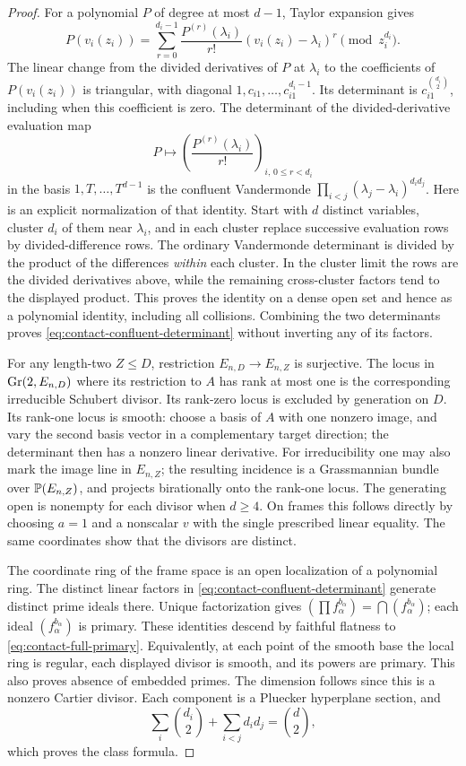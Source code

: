 \begin{proof}
For a polynomial $P$ of degree at most $d-1$, Taylor expansion gives
\[
 P(v_i(z_i))=\sum_{r=0}^{d_i-1}
             \frac{P^{(r)}(\lambda_i)}{r!}
                    (v_i(z_i)-\lambda_i)^r\pmod {z_i^{d_i}}.
\]
The linear change from the divided derivatives of $P$ at $\lambda_i$
to the coefficients of $P(v_i(z_i))$ is triangular, with diagonal
$1,c_{i1},\ldots,c_{i1}^{d_i-1}$. Its determinant is
$c_{i1}^{\binom{d_i}{2}}$, including when this coefficient is zero.
The determinant of the divided-derivative evaluation map
\[
 P\longmapsto\left(\frac{P^{(r)}(\lambda_i)}{r!}\right)_{i,\,0\le r<d_i}
\]
in the basis $1,T,\ldots,T^{d-1}$ is the confluent Vandermonde
$\prod_{i<j}(\lambda_j-\lambda_i)^{d_i d_j}$. Here is an explicit
normalization of that identity. Start with $d$ distinct variables,
cluster $d_i$ of them near $\lambda_i$, and in each cluster replace
successive evaluation rows by divided-difference rows. The ordinary
Vandermonde determinant is divided by the product of the differences
\emph{within} each cluster. In the cluster limit the rows are the
divided derivatives above, while the remaining cross-cluster
factors tend to the displayed product. This proves the identity on
a dense open set and hence as a polynomial identity, including all
collisions. Combining the two determinants proves
\eqref{eq:contact-confluent-determinant} without inverting any of
its factors.

For any length-two $Z\le D$, restriction $E_{n,D}\to E_{n,Z}$ is
surjective. The locus in $\operatorname{Gr}(2,E_{n,D})$ where its restriction to
$A$ has rank at most one is the corresponding irreducible Schubert
divisor. Its rank-zero locus is excluded by generation on $D$.
Its rank-one locus is smooth: choose a basis of $A$ with one nonzero
image, and vary the second basis vector in a complementary target
direction; the determinant then has a nonzero linear derivative.
For irreducibility one may also mark the image line in $E_{n,Z}$;
the resulting incidence is a Grassmannian bundle over $\mathbb P(E_{n,Z})$,
and projects birationally onto the rank-one locus. The generating
open is nonempty for each divisor when $d\ge4$. On frames this
follows directly by choosing $a=1$ and a nonscalar $v$ with the
single prescribed linear equality. The same coordinates show that
the divisors are distinct.

The coordinate ring of the frame space is an open localization of
a polynomial ring. The distinct linear factors in
\eqref{eq:contact-confluent-determinant} generate distinct prime
ideals there. Unique factorization gives
$(\prod f_\alpha^{b_\alpha})=\bigcap(f_\alpha^{b_\alpha})$;
each ideal $(f_\alpha^{b_\alpha})$ is primary. These identities
descend by faithful flatness to \eqref{eq:contact-full-primary}.
Equivalently, at each point of the smooth base the local ring is
regular, each displayed divisor is smooth, and its powers are
primary. This also proves absence of embedded primes. The dimension
follows since this is a nonzero Cartier divisor. Each component is
a Pluecker hyperplane section, and
\[
 \sum_i\binom{d_i}{2}+\sum_{i<j}d_i d_j=\binom d2,
\]
which proves the class formula.


\end{proof}
